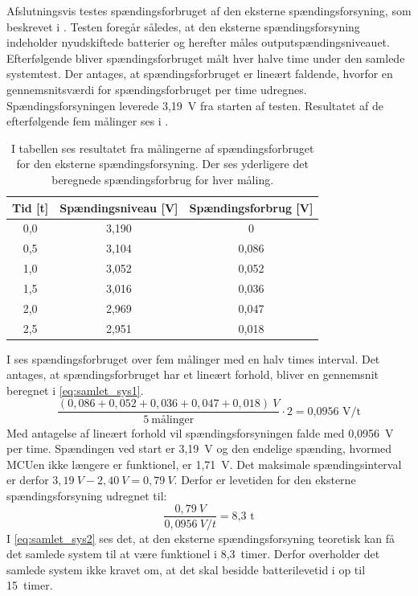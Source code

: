 Afslutningsvis testes spændingsforbruget af den eksterne spændingsforsyning, som beskrevet i . Testen foregår således, at den eksterne spændingsforsyning indeholder nyudskiftede batterier og herefter måles outputspændingsniveauet. Efterfølgende bliver spændingsforbruget målt hver halve time under den samlede systemtest. Der antages, at spændingsforbruget er lineært faldende, hvorfor en gennemsnitsværdi for spændingsforbruget per time udregnes. \\
Spændingsforsyningen leverede 3,19~V fra starten af testen. Resultatet af de efterfølgende fem målinger ses i .
\begin{table}[H]
	\centering
	\begin{tabular}{ccc}
		\hline
		\cellcolor[HTML]{C0C0C0}Tid {[}t{]} & \cellcolor[HTML]{C0C0C0} Spændingsniveau {[}V{]} & \cellcolor[HTML]{C0C0C0}Spændingsforbrug {[}V{]} \\ \hline
		0,0 & 3,190 & 0 \\ \hline	
		0,5 & 3,104 & 0,086 \\ \hline	
		1,0 & 3,052 & 0,052 \\ \hline
		1,5 & 3,016 & 0,036 \\ \hline
		2,0 & 2,969 & 0,047 \\ \hline
		2,5 & 2,951 & 0,018 \\ \hline
	\end{tabular}
	\caption{I tabellen ses resultatet fra målingerne af spændingsforbruget for den eksterne spændingsforsyning. Der ses yderligere det beregnede spændingsforbrug for hver måling.}
	\label{tab:samlet_sys_batteri}
\end{table}\vspace{-.25cm}
I  ses spændingsforbruget over fem målinger med en halv times interval. Det antages, at spændingsforbruget har et lineært forhold, bliver en gennemsnit beregnet i \eqref{eq:samlet_sys1}.
\begin{equation}
\frac{(0,086 + 0,052 + 0,036 + 0,047 + 0,018)~V}{5~\text{målinger}} \cdot 2 = \text{0,0956~V/t}
\label{eq:samlet_sys1}
\end{equation}
Med antagelse af lineært forhold vil spændingsforsyningen falde med 0,0956~V per time. Spændingen ved start er 3,19~V og den endelige spænding, hvormed MCUen ikke længere er funktionel, er 1,71~V. Det maksimale spændingsinterval er derfor $3,19~V - 2,40~V = 0,79~V$. Derfor er levetiden for den eksterne spændingsforsyning udregnet til:
\begin{equation}
\frac{0,79~V}{0,0956~V/t} = \text{8,3~t}
\label{eq:samlet_sys2}
\end{equation}
I \eqref{eq:samlet_sys2} ses det, at den eksterne spændingsforsyning teoretisk kan få det samlede system til at være funktionel i 8,3~timer. Derfor overholder det samlede system ikke kravet om, at det skal besidde batterilevetid i op til 15~timer. 